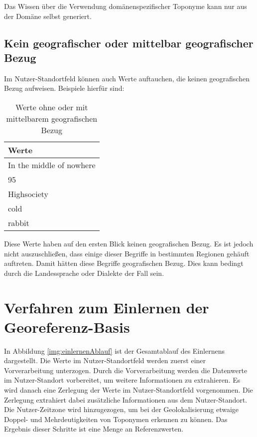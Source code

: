 			Das Wissen über die Verwendung domänenspezifischer Toponyme kann nur aus der Domäne selbst generiert.
		
		\subsection{Kein geografischer oder mittelbar geografischer Bezug} \label{sub:keinGeogOdMittelBarereBezug}

			Im Nutzer-Standortfeld können auch Werte auftauchen, die keinen geografischen Bezug aufweisen.
			Beispiele hierfür sind:

			\begin{table}[h]
			\centering
			\caption{Werte ohne oder mit mittelbarem geografischen Bezug}
			\label{tab:keinOderMittelbarBezug}
			\begin{tabular}{|l|}
			\hline
			Werte                      	\\ \hline
			In the middle of nowhere   	\\ \hline
			95                         	\\ \hline
			Highsociety                	\\ \hline
			cold	                 	\\ \hline
			rabbit     					\\ \hline
			\end{tabular}
			\end{table}

			Diese Werte haben auf den ersten Blick keinen geografischen Bezug.
			Es ist jedoch nicht auszuschließen, dass einige dieser Begriffe in bestimmten Regionen gehäuft auftreten.
			Damit hätten diese Begriffe geografischen Bezug.
			Dies kann bedingt durch die Landessprache oder Dialekte der Fall sein.

	\section{Verfahren zum Einlernen der Georeferenz-Basis} \label{sec:VefrahrenZumEinlernen} 	

			
			In Abbildung \ref{img:einlernenAblauf} ist der Gesamtablauf des Einlernens dargestellt. 
			Die Werte im Nutzer-Standortfeld werden zuerst einer Vorverarbeitung unterzogen. 
			Durch die Vorverarbeitung werden die Datenwerte im Nutzer-Standort vorbereitet, um weitere Informationen zu extrahieren.
			Es wird danach eine Zerlegung der Werte im Nutzer-Standortfeld vorgenommen.
			Die Zerlegung extrahiert dabei zusätzliche Informationen aus dem Nutzer-Standort.
			Die Nutzer-Zeitzone wird hinzugezogen, um bei der Geolokalisierung etwaige Doppel- und Mehrdeutigkeiten von Toponymen erkennen zu können.
			Das Ergebnis dieser Schritte ist eine Menge an Referenzwerten.

